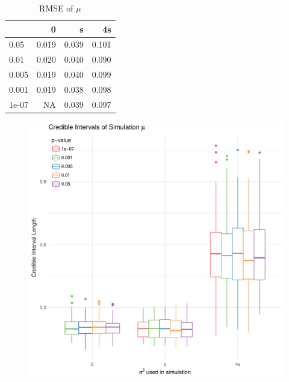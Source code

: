 \documentclass[AMA,STIX1COL]{WileyNJD-v2}\usepackage[]{graphicx}\usepackage[]{color}
\makeatletter
\def\maxwidth{ %
  \ifdim\Gin@nat@width>\linewidth
    \linewidth
  \else
    \Gin@nat@width
  \fi
}
\newenvironment{knitrout}{}{} %
\makeatother
\begin{document}
\begin{knitrout}
\color{fgcolor}\begin{table}

\caption{\label{tab:unnamed-chunk-33}RMSE of $\mu$}
\centering
\begin{tabular}[t]{l|r|r|r}
\hline
  & 0 & s & 4s\\
\hline
0.05 & 0.019 & 0.039 & 0.101\\
\hline
0.01 & 0.020 & 0.040 & 0.090\\
\hline
0.005 & 0.019 & 0.040 & 0.099\\
\hline
0.001 & 0.019 & 0.038 & 0.098\\
\hline
1e-07 & NA & 0.039 & 0.097\\
\hline
\end{tabular}
\end{table}


\end{knitrout}



\begin{figure}
\begin{knitrout}
\color{fgcolor}
\includegraphics[width=\maxwidth]{figure/unnamed-chunk-34-1} 

\end{knitrout}
\end{figure}
\end{document}
